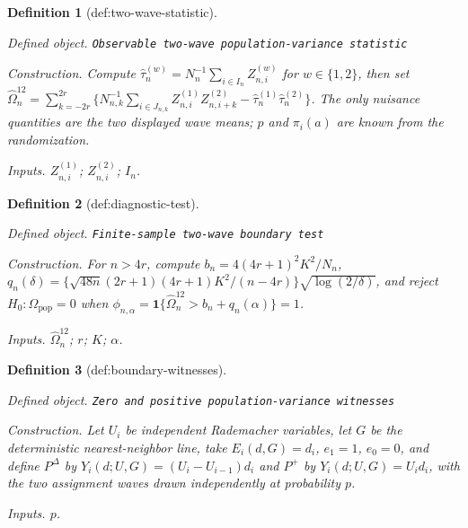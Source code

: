 \documentclass{article}
\newtheorem{definition}{Definition}
\begin{document}
\begin{definition}[def:two-wave-statistic]\label{def:two-wave-statistic}
\par\smallskip\noindent\emph{Defined object.} \texttt{Observable two-\allowbreak{}wave population-\allowbreak{}variance statistic}
\par\smallskip\noindent\emph{Construction.} Compute \(\widehat\tau_n^{(w)}=N_n^{-1}\sum_{i\in I_n}Z_{n,i}^{(w)}\) for \(w\in\{1,2\}\), then set \(\widehat\Omega_n^{12}=\sum_{k=-2r}^{2r}\{N_{n,k}^{-1}\sum_{i\in J_{n,k}}Z_{n,i}^{(1)}Z_{n,i+k}^{(2)}-\widehat\tau_n^{(1)}\widehat\tau_n^{(2)}\}\). The only nuisance quantities are the two displayed wave means; \(p\) and \(\pi_i(a)\) are known from the randomization.
\par\smallskip\noindent\emph{Inputs.} \(Z_{n,i}^{(1)}\); \(Z_{n,i}^{(2)}\); \(I_n\).
\end{definition}

\begin{definition}[def:diagnostic-test]\label{def:diagnostic-test}
\par\smallskip\noindent\emph{Defined object.} \texttt{Finite-\allowbreak{}sample two-\allowbreak{}wave boundary test}
\par\smallskip\noindent\emph{Construction.} For \(n>4r\), compute \(b_n=4(4r+1)^2K^2/N_n\), \(q_n(\delta)=\{\sqrt{48n}(2r+1)(4r+1)K^2/(n-4r)\}\sqrt{\log(2/\delta)}\), and reject \(H_0:\Omega_{\mathrm{pop}}=0\) when \(\phi_{n,\alpha}=\mathbf 1\{\widehat\Omega_n^{12}>b_n+q_n(\alpha)\}=1\).
\par\smallskip\noindent\emph{Inputs.} \(\widehat\Omega_n^{12}\); \(r\); \(K\); \(\alpha\).
\end{definition}

\begin{definition}[def:boundary-witnesses]\label{def:boundary-witnesses}
\par\smallskip\noindent\emph{Defined object.} \texttt{Zero and positive population-\allowbreak{}variance witnesses}
\par\smallskip\noindent\emph{Construction.} Let \(U_i\) be independent Rademacher variables, let \(G\) be the deterministic nearest-neighbor line, take \(E_i(d,G)=d_i\), \(e_1=1\), \(e_0=0\), and define \(P^{\Delta}\) by \(Y_i(d;U,G)=(U_i-U_{i-1})d_i\) and \(P^{+}\) by \(Y_i(d;U,G)=U_id_i\), with the two assignment waves drawn independently at probability \(p\).
\par\smallskip\noindent\emph{Inputs.} \(p\).
\end{definition}
\end{document}
